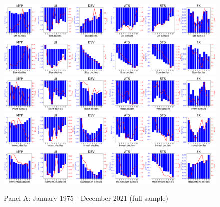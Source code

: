 \documentclass[11pt,halfline,a4paper]{ouparticle}
\begin{document}
\newpage


\begin{figure}
  \centering  \captionsetup{justification=raggedright,singlelinecheck=false}
      \caption{Panel A: January 1975 - December 2021 (full sample)}
      \label{fig:betafig}
    \includegraphics[width=16cm]{plots/betahist1_sample0.png}\\
    \includegraphics[width=16cm]{plots/betahist2_sample0.png}\\
    \includegraphics[width=16cm]{plots/betahist3_sample0.png}\\
    \includegraphics[width=16cm]{plots/betahist4_sample0.png}\\
    \includegraphics[width=16cm]{plots/betahist5_sample0.png}\\
\end{figure}
    \clearpage
\end{document}
